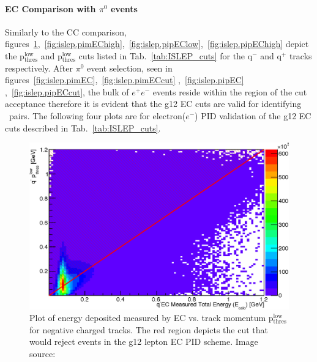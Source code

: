 \FloatBarrier

\paragraph{\label{sec:data.lepton.ec}EC Comparison with $\pi^0$ events}
		
		Similarly to the CC comparison, figures~\ref{fig:islep.pimEClow},~\ref{fig:islep.pimEChigh},~\ref{fig:islep.pipEClow},~\ref{fig:islep.pipEChigh} depict the  p$\mathrm{_{thres}^{low}}$ and  p$\mathrm{_{thres}^{low}}$ cuts listed in Tab.~\ref{tab:ISLEP_cuts} for the q$^-$ and q$^+$ tracks respectively. After $\pi^0$ event selection, seen in figures~\ref{fig:islep.pimEC},~\ref{fig:islep.pimECcut} ,~\ref{fig:islep.pipEC} ,~\ref{fig:islep.pipECcut}, the bulk of $e^+e^-$ events reside within the region of the cut acceptance therefore it is evident that the g12 EC cuts are valid for identifying \epemT \ pairs. The following four plots are for electron($e^-$) PID validation of the g12 EC cuts described in Tab.~\ref{tab:ISLEP_cuts}.
\begin{figure}\begin{center}
				\includegraphics[width=0.8\figwidth]{figures/lepton/Pim_EClow.eps}
				\caption[EC Deposited Energy Comparison to Lower Threshold Track Momentum for q$^-$ Tracks]{\label{fig:islep.pimEClow}Plot of energy deposited measured by EC vs. track momentum p$\mathrm{_{thres}^{low}}$ for negative charged tracks. The red region depicts the cut that would reject events in the g12 lepton EC PID scheme. Image source:~\cite{thesiskunkel}}
\end{center}\end{figure}
			
